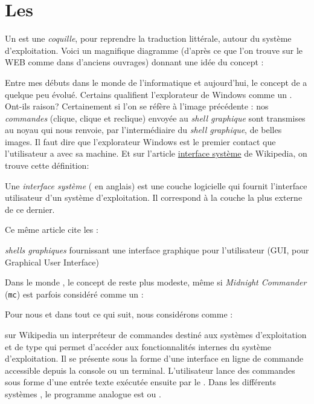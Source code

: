 
\section{Les \shells{}}
Un \shell{} est une \emph{coquille}, pour reprendre la traduction littérale, autour du système d'exploitation. Voici un magnifique diagramme (d'après ce que l'on trouve sur le WEB comme dans d'anciens ouvrages) donnant une idée du concept :


Entre mes débuts dans le monde de l'informatique et aujourd'hui, le concept de  \shell{} a quelque peu évolué. Certains qualifient l'explorateur de Windows comme un  \shell{}. Ont-ils raison? Certainement si l'on se réfère à l'image précédente : nos \emph{commandes} (clique, clique et reclique) envoyée au \emph{shell graphique} sont transmises au noyau qui nous renvoie, par l'intermédiaire du \emph{shell graphique}, de belles images. Il faut dire que l'explorateur Windows est le premier contact que l'utilisateur a avec sa machine.  Et sur l'article \href{http://fr.wikipedia.org/wiki/Interface_syst%C3%A8me}{interface système} de Wikipedia, on trouve cette définition:

\begin{Quote}
Une \emph{interface système }( \shell{} en anglais) est une couche logicielle qui fournit l'interface utilisateur d'un système d'exploitation. Il correspond à la couche la plus externe de ce dernier.
\end{Quote}

Ce même article cite les :
\begin{Quote}
\emph{shells graphiques} fournissant une interface graphique pour l'utilisateur (GUI, pour Graphical User Interface)
\end{Quote}

Dans le monde \unix{}, le concept de  \shell{} reste plus modeste, même si \emph{Midnight Commander} (\texttt{mc}) est parfois considéré comme un \shell{}:


Pour nous et dans tout ce qui suit, nous considérons comme  \shell{} :

\begin{Quotebis}{\href{http://fr.wikipedia.org/wiki/Shell_Unix}{ \shell{} \unix{}} sur Wikipedia}
un interpréteur de commandes destiné aux systèmes d'exploitation \unix{} et de type \unix{} qui permet d'accéder aux fonctionnalités internes du système d'exploitation. Il se présente sous la forme d'une interface en ligne de commande accessible depuis la console ou un terminal. L'utilisateur lance des commandes sous forme d'une entrée texte exécutée ensuite par le  \shell{}. Dans les différents systèmes \windows, le programme analogue est  ou .
\end{Quotebis}

